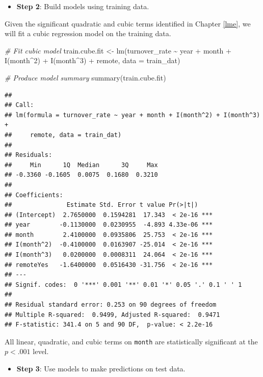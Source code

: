 \documentclass[
]{book}
\newenvironment{Shaded}{\begin{snugshade}}{\end{snugshade}}
\newcommand{\AttributeTok}[1]{\textcolor[rgb]{0.77,0.63,0.00}{#1}}
\newcommand{\CommentTok}[1]{\textcolor[rgb]{0.56,0.35,0.01}{\textit{#1}}}
\newcommand{\DecValTok}[1]{\textcolor[rgb]{0.00,0.00,0.81}{#1}}
\newcommand{\FunctionTok}[1]{\textcolor[rgb]{0.00,0.00,0.00}{#1}}
\newcommand{\NormalTok}[1]{#1}
\newcommand{\OtherTok}[1]{\textcolor[rgb]{0.56,0.35,0.01}{#1}}
\newcommand{\SpecialCharTok}[1]{\textcolor[rgb]{0.00,0.00,0.00}{#1}}
\providecommand{\tightlist}{%
  \setlength{\itemsep}{0pt}\setlength{\parskip}{0pt}}
\begin{document}
\begin{itemize}
\tightlist
\item
  \textbf{Step 2}: Build models using training data.
\end{itemize}

Given the significant quadratic and cubic terms identified in Chapter \ref{lme}, we will fit a cubic regression model on the training data.

\begin{Shaded}
\begin{Highlighting}[]
\CommentTok{\# Fit cubic model}
\NormalTok{train.cube.fit }\OtherTok{\textless{}{-}} \FunctionTok{lm}\NormalTok{(turnover\_rate }\SpecialCharTok{\textasciitilde{}}\NormalTok{ year }\SpecialCharTok{+}\NormalTok{ month }\SpecialCharTok{+} \FunctionTok{I}\NormalTok{(month}\SpecialCharTok{\^{}}\DecValTok{2}\NormalTok{) }\SpecialCharTok{+} \FunctionTok{I}\NormalTok{(month}\SpecialCharTok{\^{}}\DecValTok{3}\NormalTok{) }\SpecialCharTok{+}\NormalTok{ remote, }\AttributeTok{data =}\NormalTok{ train\_dat)}

\CommentTok{\# Produce model summary}
\FunctionTok{summary}\NormalTok{(train.cube.fit)}
\end{Highlighting}
\end{Shaded}

\begin{verbatim}
## 
## Call:
## lm(formula = turnover_rate ~ year + month + I(month^2) + I(month^3) + 
##     remote, data = train_dat)
## 
## Residuals:
##     Min      1Q  Median      3Q     Max 
## -0.3360 -0.1605  0.0075  0.1680  0.3210 
## 
## Coefficients:
##               Estimate Std. Error t value Pr(>|t|)    
## (Intercept)  2.7650000  0.1594281  17.343  < 2e-16 ***
## year        -0.1130000  0.0230955  -4.893 4.33e-06 ***
## month        2.4100000  0.0935806  25.753  < 2e-16 ***
## I(month^2)  -0.4100000  0.0163907 -25.014  < 2e-16 ***
## I(month^3)   0.0200000  0.0008311  24.064  < 2e-16 ***
## remoteYes   -1.6400000  0.0516430 -31.756  < 2e-16 ***
## ---
## Signif. codes:  0 '***' 0.001 '**' 0.01 '*' 0.05 '.' 0.1 ' ' 1
## 
## Residual standard error: 0.253 on 90 degrees of freedom
## Multiple R-squared:  0.9499, Adjusted R-squared:  0.9471 
## F-statistic: 341.4 on 5 and 90 DF,  p-value: < 2.2e-16
\end{verbatim}

All linear, quadratic, and cubic terms on \texttt{month} are statistically significant at the \(p < .001\) level.

\begin{itemize}
\tightlist
\item
  \textbf{Step 3}: Use models to make predictions on test data.
\end{itemize}
\end{document}
